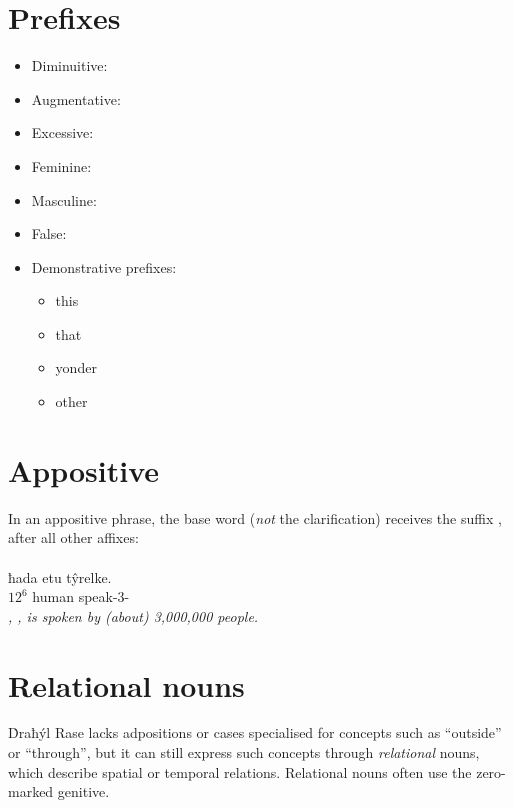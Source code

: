\documentclass{book}
\begin{document}
\section{Prefixes}

\begin{itemize}
    \item Diminuitive: 
    \item Augmentative: 
    \item Excessive: 
    \item Feminine: 
    \item Masculine: 
    \item False: 
    \item Demonstrative prefixes:
    \begin{itemize}
        \item {} this
        \item {} that
        \item {} yonder
        \item {} other
    \end{itemize}
\end{itemize}

\section{Appositive}

In an appositive phrase, the base word (\emph{not} the clarification) receives the suffix , after all other affixes: \\
~ \\
  ħada etu tŷrelke. \\
$12^6$ human\bs{}
speak\bs{}-3- \\
\textit{, , is spoken by (about) 3,000,000 people.}

\section{Relational nouns}

Ḋraħýl Rase lacks adpositions or cases specialised for concepts such as ``outside'' or ``through'', but it can still express such concepts through \emph{relational} nouns, which describe spatial or temporal relations. Relational nouns often use the zero-marked genitive.
\end{document}
